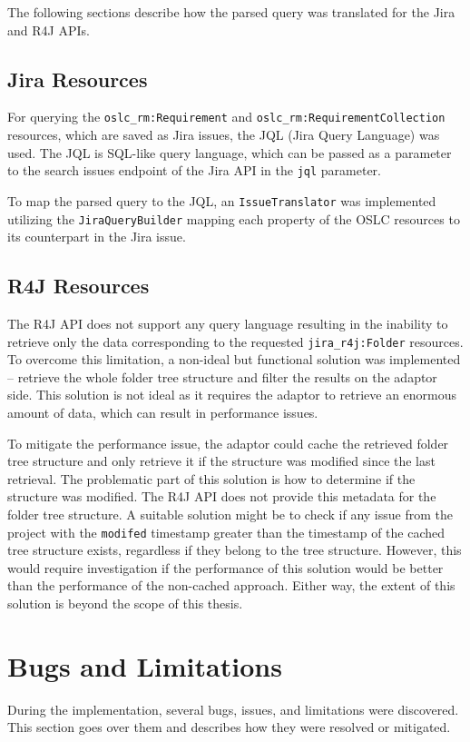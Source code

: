 The following sections describe how the parsed query was translated for the Jira and R4J APIs.

\subsection*{Jira Resources}
For querying the \texttt{oslc\_rm:Requirement} and \texttt{oslc\_rm:RequirementCollection} resources, which are saved as Jira issues, the JQL (Jira Query Language) \cite{jql} was used. The JQL is SQL-like query language, which can be passed as a parameter to the search issues endpoint of the Jira API in the \texttt{jql} parameter.

To map the parsed query to the JQL, an \texttt{IssueTranslator} was implemented utilizing the \texttt{JiraQueryBuilder} mapping each property of the OSLC resources to its counterpart in the Jira issue.

\subsection*{R4J Resources}
\label{sec:r4j_query}
The R4J API does not support any query language resulting in the inability to retrieve only the data corresponding to the requested \texttt{jira\_r4j:Folder} resources. To overcome this limitation, a non-ideal but functional solution was implemented -- retrieve the whole folder tree structure and filter the results on the adaptor side. This solution is not ideal as it requires the adaptor to retrieve an enormous amount of data, which can result in performance issues.

To mitigate the performance issue, the adaptor could cache the retrieved folder tree structure and only retrieve it if the structure was modified since the last retrieval. The problematic part of this solution is how to determine if the structure was modified. The R4J API does not provide this metadata for the folder tree structure. A suitable solution might be to check if any issue from the project with the \texttt{modifed} timestamp greater than the timestamp of the cached tree structure exists, regardless if they belong to the tree structure. However, this would require investigation if the performance of this solution would be better than the performance of the non-cached approach. Either way, the extent of this solution is beyond the scope of this thesis.

\section{Bugs and Limitations}
During the implementation, several bugs, issues, and limitations were discovered. This section goes over them and describes how they were resolved or mitigated.


